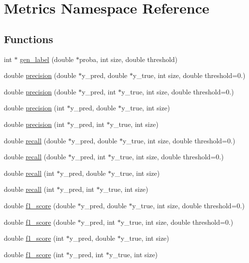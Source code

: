 \hypertarget{namespace_metrics}{\section{Metrics Namespace Reference}
\label{namespace_metrics}
}
\subsection*{Functions}
\begin{DoxyCompactItemize}
\item 
int $\ast$ \hyperlink{namespace_metrics_a9b8065c1e0adb089751090c8a94e3ae6}{gen\+\_\+label} (double $\ast$proba, int size, double threshold)
\item 
double \hyperlink{namespace_metrics_a96311ddea270f7ff6c4ac5b91767f702}{precision} (double $\ast$y\+\_\+pred, double $\ast$y\+\_\+true, int size, double threshold=0.)
\item 
double \hyperlink{namespace_metrics_a157b4ff1200e77c47daf909a2e7d49ee}{precision} (double $\ast$y\+\_\+pred, int $\ast$y\+\_\+true, int size, double threshold=0.)
\item 
double \hyperlink{namespace_metrics_a16362de879cdf8dab362dfd211232284}{precision} (int $\ast$y\+\_\+pred, double $\ast$y\+\_\+true, int size)
\item 
double \hyperlink{namespace_metrics_a77cba9a6f7c588248a56b126a20105db}{precision} (int $\ast$y\+\_\+pred, int $\ast$y\+\_\+true, int size)
\item 
double \hyperlink{namespace_metrics_a9ef049a2c45137e86e228fe7cf2b57f4}{recall} (double $\ast$y\+\_\+pred, double $\ast$y\+\_\+true, int size, double threshold=0.)
\item 
double \hyperlink{namespace_metrics_ae0d868e0ddeed82cb579773b1f432673}{recall} (double $\ast$y\+\_\+pred, int $\ast$y\+\_\+true, int size, double threshold=0.)
\item 
double \hyperlink{namespace_metrics_a3b87d54b9d3e605a27fe00ac1e3d4672}{recall} (int $\ast$y\+\_\+pred, double $\ast$y\+\_\+true, int size)
\item 
double \hyperlink{namespace_metrics_a1b1451b44b83cf9e2f9afd9305093ce7}{recall} (int $\ast$y\+\_\+pred, int $\ast$y\+\_\+true, int size)
\item 
double \hyperlink{namespace_metrics_a85985c7a2f23859943773cee69d63ad3}{f1\+\_\+score} (double $\ast$y\+\_\+pred, double $\ast$y\+\_\+true, int size, double threshold=0.)
\item 
double \hyperlink{namespace_metrics_af5c4ef1b7e222c8f9aa6b96338267ff4}{f1\+\_\+score} (double $\ast$y\+\_\+pred, int $\ast$y\+\_\+true, int size, double threshold=0.)
\item 
double \hyperlink{namespace_metrics_a7dc4fe858f813aa43b6114d3575d64cc}{f1\+\_\+score} (int $\ast$y\+\_\+pred, double $\ast$y\+\_\+true, int size)
\item 
double \hyperlink{namespace_metrics_a682bea659607659fc89a1a511191b6c5}{f1\+\_\+score} (int $\ast$y\+\_\+pred, int $\ast$y\+\_\+true, int size)
\end{DoxyCompactItemize}


